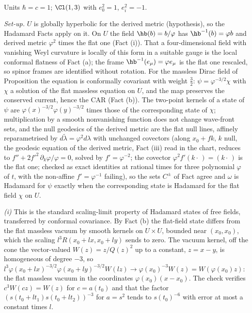 Units $\hbar = c = 1$; $\Cl(1,3)$ with $e_{0}^{2} = 1$, $e_{i}^{2} = -1$.

\emph{Set-up.} $U$ is globally hyperbolic for the derived metric (hypothesis), so the Hadamard Facts apply on it. On $U$ the field $\hb(b) = b/\varphi$ has $\hb^{-1}(b) = \varphi b$ and derived metric $\varphi^{2}$ times the flat one (Fact (i)). That a four-dimensional field with vanishing Weyl curvature is locally of this form in a suitable gauge is the local conformal flatness of Fact (a); the frame $\hb^{-1}(e_{\mu}) = \varphi e_{\mu}$ is the flat one rescaled, so spinor frames are identified without rotation. For the massless Dirac field of Proposition  the equation is conformally covariant with weight $\tfrac32$: $\psi = \varphi^{-3/2}\chi$ with $\chi$ a solution of the flat massless equation on $U$, and the map preserves the conserved current, hence the CAR (Fact (b)). The two-point kernels of a state of $\psi$ are $\varphi(x)^{-3/2}\varphi(y)^{-3/2}$ times those of the corresponding state of $\chi$; multiplication by a smooth nonvanishing function does not change wave-front sets, and the null geodesics of the derived metric are the flat null lines, affinely reparametrised by $d\tilde\lambda = \varphi^{2}d\lambda$ with unchanged covectors (along $x_{0} + f k$, $k$ null, the geodesic equation of the derived metric, Fact (iii) read in the chart, reduces to $f'' + 2f'^{2}\,\partial_{k}\varphi/\varphi = 0$, solved by $f' = \varphi^{-2}$; the covector $\varphi^{2}f'(k\cdot\,) = (k\cdot\,)$ is the flat one; checked as exact identities at rational times for three polynomial $\varphi$ of $t$, with the non-affine $f' = \varphi^{-1}$ failing), so the sets $C^{\pm}$ of Fact  agree and $\omega$ is Hadamard for $\psi$ exactly when the corresponding state is Hadamard for the flat field $\chi$ on $U$.

\emph{(i)} This is the standard scaling-limit property of Hadamard states of free fields, transferred by conformal covariance. By Fact (b) the flat-field state differs from the flat massless vacuum by smooth kernels on $U \times U$, bounded near $(x_{0}, x_{0})$, which the scaling $l^{3}R(x_{0} + lx, x_{0} + ly)$ sends to zero. The vacuum kernel, off the cone the vector-valued $W(z) = z/Q(z)^{2}$ up to a constant, $z = x - y$, is homogeneous of degree $-3$, so $l^{3}\varphi(x_{0} + lx)^{-3/2}\varphi(x_{0} + ly)^{-3/2}W(lz) \to \varphi(x_{0})^{-3}W(z) = W(\varphi(x_{0})z)$: the flat massless vacuum in the coordinates $\varphi(x_{0})(x - x_{0})$. The check verifies $c^{3}W(cz) = W(z)$ for $c = a(t_{0})$ and that the factor $(s(t_{0} + lt_{1})s(t_{0} + lt_{2}))^{-3}$ for $a = s^{2}$ tends to $s(t_{0})^{-6}$ with error at most a constant times $l$.

